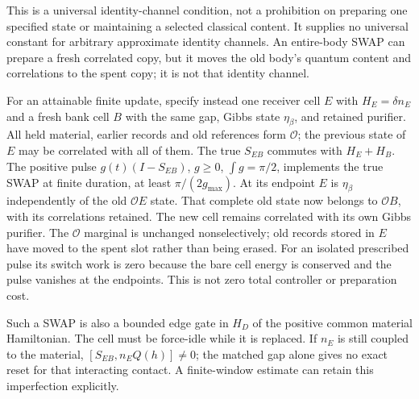This is a universal identity-channel condition, not a prohibition on
preparing one specified state or maintaining a selected classical
content. It supplies no universal constant for arbitrary approximate
identity channels. An entire-body SWAP can prepare a fresh correlated
copy, but it moves the old body's quantum content and correlations to
the spent copy; it is not that identity channel.

For an attainable finite update, specify instead one receiver cell
$E$ with $H_E=\delta n_E$ and a fresh bank cell $B$ with the same
gap, Gibbs state $\eta_\beta$, and retained purifier.
All held material, earlier records and old references form $\mathcal O$;
the previous state of $E$ may be correlated with all of them.
The true $S_{EB}$ commutes with $H_E+H_B$.
The positive pulse $g(t)(I-S_{EB})$, $g\ge0$,
$\int g=\pi/2$, implements the true SWAP at finite duration,
at least $\pi/(2g_{\max})$.
At its endpoint $E$ is $\eta_\beta$ independently of the old
$\mathcal O E$ state. That complete old state now belongs to
$\mathcal O B$, with its correlations retained. The new cell remains
correlated with its own Gibbs purifier.
The $\mathcal O$ marginal is unchanged nonselectively; old records
stored in $E$ have moved to the spent slot rather than being erased.
For an isolated prescribed pulse its switch work is zero because the
bare cell energy is conserved and the pulse vanishes at the endpoints.
This is not zero total controller or preparation cost.

Such a SWAP is also a bounded edge gate in $H_D$ of the positive
common material Hamiltonian. The cell must be force-idle while it is
replaced. If $n_E$ is still coupled to the material,
$[S_{EB},n_EQ(h)]\ne0$; the matched gap alone gives no exact reset
for that interacting contact. A finite-window estimate can retain
this imperfection explicitly.

